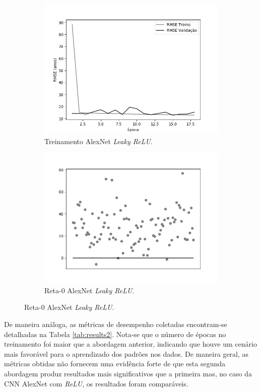 \begin{figure}[h!]
		\begin{subfigure}[hb]{0.5\linewidth}
			\caption{Treinamento AlexNet \emph{Leaky ReLU}.}
			\centering
			\includegraphics[width=\linewidth]{img/graficos/history/alexnet/fig-history-image-treat-2-alexnet-lrelu-rmse.png}
		\end{subfigure}
		\begin{subfigure}[hb]{0.5\linewidth}
			\caption{Reta-0 AlexNet \emph{Leaky ReLU}.}
			\includegraphics[width=\linewidth]{img/graficos/reta0/alexnet/fig-reta-0-image-treat-2-alexnet-lrelu.png}
		\end{subfigure}%
	\end{figure}

	De maneira análoga, as métricas de desempenho coletadas encontram-se detalhadas na Tabela \ref{tab:results2}. Nota-se que o número de épocas no treinamento foi maior que a abordagem anterior, indicando que houve um cenário mais favorável para o aprendizado dos padrões nos dados. De maneira geral, as métricas obtidas não fornecem uma evidência forte de que esta segunda abordagem produz resultados mais significativos que a primeira mas, no caso da CNN AlexNet com \emph{ReLU}, os resultados foram comparáveis.

